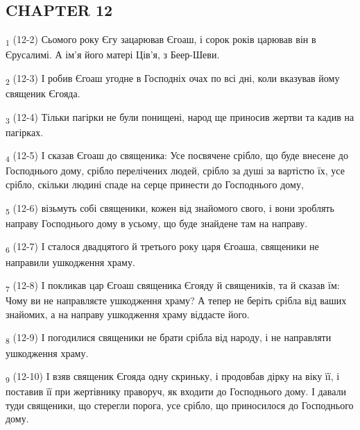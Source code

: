 \subsection{CHAPTER 12}
\begin{tcolorbox}
\textsubscript{1} (12-2) Сьомого року Єгу зацарював Єгоаш, і сорок років царював він в Єрусалимі. А ім'я його матері Ців'я, з Беер-Шеви.
\end{tcolorbox}
\begin{tcolorbox}
\textsubscript{2} (12-3) І робив Єгоаш угодне в Господніх очах по всі дні, коли вказував йому священик Єгояда.
\end{tcolorbox}
\begin{tcolorbox}
\textsubscript{3} (12-4) Тільки пагірки не були понищені, народ ще приносив жертви та кадив на пагірках.
\end{tcolorbox}
\begin{tcolorbox}
\textsubscript{4} (12-5) І сказав Єгоаш до священика: Усе посвячене срібло, що буде внесене до Господнього дому, срібло перелічених людей, срібло за душі за вартістю їх, усе срібло, скільки людині спаде на серце принести до Господнього дому,
\end{tcolorbox}
\begin{tcolorbox}
\textsubscript{5} (12-6) візьмуть собі священики, кожен від знайомого свого, і вони зроблять направу Господнього дому в усьому, що буде знайдене там на направу.
\end{tcolorbox}
\begin{tcolorbox}
\textsubscript{6} (12-7) І сталося двадцятого й третього року царя Єгоаша, священики не направили ушкодження храму.
\end{tcolorbox}
\begin{tcolorbox}
\textsubscript{7} (12-8) І покликав цар Єгоаш священика Єгояду й священиків, та й сказав їм: Чому ви не направляєте ушкодження храму? А тепер не беріть срібла від ваших знайомих, а на направу ушкодження храму віддасте його.
\end{tcolorbox}
\begin{tcolorbox}
\textsubscript{8} (12-9) І погодилися священики не брати срібла від народу, і не направляти ушкодження храму.
\end{tcolorbox}
\begin{tcolorbox}
\textsubscript{9} (12-10) І взяв священик Єгояда одну скриньку, і продовбав дірку на віку її, і поставив її при жертівнику праворуч, як входити до Господнього дому. І давали туди священики, що стерегли порога, усе срібло, що приносилося до Господнього дому.
\end{tcolorbox}
